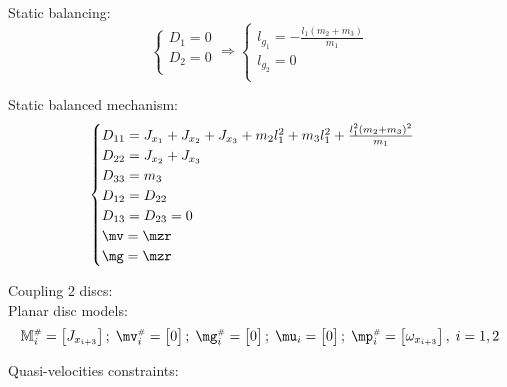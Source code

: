 \documentclass[a4paper,11pt,brazil,fleqn]{article}
\begin{document}
Static balancing:
\begin{equation}
\begin{cases}
D_1 = 0 \\
D_2 = 0 \\
\end{cases}
\Rightarrow
\begin{cases}
l_{g_1} = -\frac{l_1 (m_2+m_3)}{m_1} \\
l_{g_2} = 0 \\
\end{cases}
\end{equation}

Static balanced mechanism:
\begin{equation}
\begin{cases}
D_{11} = J_{x_1} + J_{x_2} + J_{x_3} + m_2 l_1^2 + m_3 l_1^2 + \frac{l_1^2 (m_2 + m_3)^2}{m_1} \\
D_{22} = J_{x_2} + J_{x_3} \\
D_{33} = m_3 \\
D_{12} = D_{22} \\
D_{13} = D_{23} = 0 \\
\mv = \mzr \\
\mg = \mzr
\end{cases}
\end{equation}

Coupling 2 discs: \\

Planar disc models: 
\begin{equation}
\mM\ssh_i = \begin{bmatrix} J_{x_{i+3}} \end{bmatrix}; \; \mv\ssh_i = \begin{bmatrix} 0 \end{bmatrix}; \; \mg\ssh_i = \begin{bmatrix} 0 \end{bmatrix}; \; \mu_i = \begin{bmatrix} 0 \end{bmatrix}; \; \mp\ssh_i = \begin{bmatrix} \omega_{x_{i+3}} \end{bmatrix}, \; i = 1, 2
\end{equation}

Quasi-velocities constraints:
\end{document}
